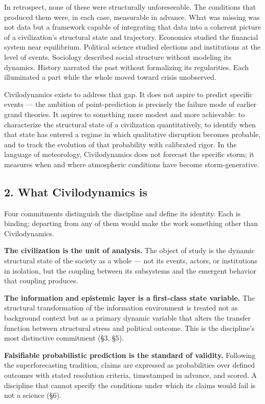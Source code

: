 \documentclass[
]{article}
\newcounter{none} %
\begin{document}
In retrospect, none of these were structurally unforeseeable. The
conditions that produced them were, in each case, measurable in advance.
What was missing was not data but a framework capable of integrating
that data into a coherent picture of a civilization's structural state
and trajectory. Economics studied the financial system near equilibrium.
Political science studied elections and institutions at the level of
events. Sociology described social structure without modeling its
dynamics. History narrated the past without formalizing its
regularities. Each illuminated a part while the whole moved toward
crisis unobserved.

Civilodynamics exists to address that gap. It does not aspire to predict
specific events --- the ambition of point-prediction is precisely the
failure mode of earlier grand theories. It aspires to something more
modest and more achievable: to characterize the structural state of a
civilization quantitatively, to identify when that state has entered a
regime in which qualitative disruption becomes probable, and to track
the evolution of that probability with calibrated rigor. In the language
of meteorology, Civilodynamics does not forecast the specific storm; it
measures when and where atmospheric conditions have become
storm-generative.

\subsection{2. What Civilodynamics is}\label{what-civilodynamics-is}

Four commitments distinguish the discipline and define its identity.
Each is binding; departing from any of them would make the work
something other than Civilodynamics.

\textbf{The civilization is the unit of analysis.} The object of study
is the dynamic structural state of the society as a whole --- not its
events, actors, or institutions in isolation, but the coupling between
its subsystems and the emergent behavior that coupling produces.

\textbf{The information and epistemic layer is a first-class state
variable.} The structural transformation of the information environment
is treated not as background context but as a primary dynamic variable
that alters the transfer function between structural stress and
political outcome. This is the discipline's most distinctive commitment
(§3, §5).

\textbf{Falsifiable probabilistic prediction is the standard of
validity.} Following the superforecasting tradition, claims are
expressed as probabilities over defined outcomes with stated resolution
criteria, timestamped in advance, and scored. A discipline that cannot
specify the conditions under which its claims would fail is not a
science (§6).
\end{document}
